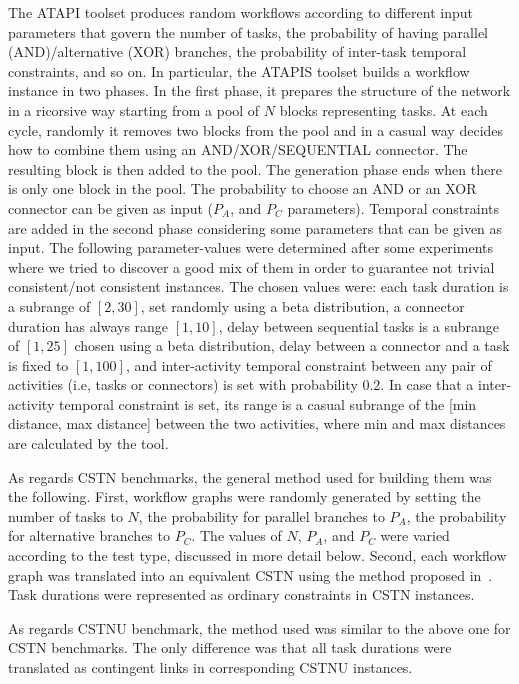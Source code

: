 \documentclass[a4paper,11pt]{article}
\begin{document}
The ATAPI toolset produces random workflows according to different input parameters that govern the number of tasks, the probability of having parallel (AND)\slash alternative (XOR) branches, the probability of inter-task temporal constraints, and so on.
In particular, the ATAPIS toolset builds a workflow instance in two phases. In the first phase, it prepares the structure of the network in a ricorsive way starting from a pool of $N$ blocks representing tasks.
At each cycle, randomly it removes two blocks from the pool and in a casual way decides how to combine them using an AND/XOR/SEQUENTIAL connector.
The resulting block is then added to the pool. The generation phase ends when there is only one block in the pool. 
The probability to choose an AND or an XOR connector can be given as input ($P_A$, and $P_C$ parameters).
Temporal constraints are added in the second phase considering some parameters that can be given as input. 
The following parameter-values were determined after some experiments where we tried to discover a good mix of them in order to guarantee not trivial consistent\slash not consistent instances.
The chosen values were:
each task duration is a subrange of $[2, 30]$, set randomly using a beta distribution,
a connector duration has always range $[1, 10]$, 
delay between sequential tasks is a subrange of $[1, 25]$ chosen using a beta distribution,
delay between a connector and a task is fixed to $[1, 100]$, 
and inter-activity temporal constraint between any pair of activities (i.e, tasks or connectors) is set with probability $0.2$.
In case that a inter-activity temporal constraint is set, its range is a casual subrange of the [min distance, max distance] between the two activities,
where min and max distances are calculated by the tool.

As regards CSTN benchmarks, the general method used for building them was the following. 
First, workflow graphs were randomly generated by setting the number of tasks to $N$, the probability for parallel branches to $P_A$, the probability for alternative branches to $P_C$. 
The values of $N$, $P_A$, and $P_C$ were varied according to the test type, discussed in more detail below. 
Second, each workflow graph was translated into an equivalent CSTN using the method proposed in~\cite{CombiGMP14}. Task durations were represented as ordinary constraints in CSTN instances.

As regards CSTNU benchmark, the method used was similar to the above one for CSTN benchmarks. The only difference was that all task durations were translated as contingent links in corresponding CSTNU instances.
\end{document}
